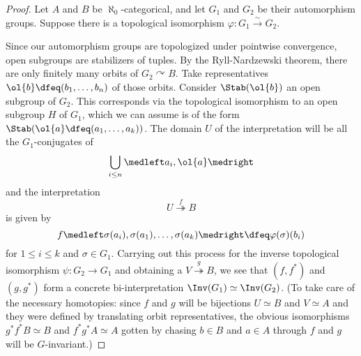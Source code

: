 
\begin{proof}
Let $A$ and $B$ be $\aleph_0$-categorical, and let $G_1$ and $G_2$ be their automorphism groups. Suppose there is a topological isomorphism $\varphi : G_1 \overset{\sim}{\to} G_2$.

Since our automorphism groups are topologized under pointwise convergence, open subgroups are stabilizers of tuples. By the Ryll-Nardzewski theorem, there are only finitely many orbits of $G_2 \curvearrowright B.$ Take representatives $\ol{b} \dfeq (b_1, \dots, b_n)$ of those orbits. Consider $\Stab(\ol{b})$ an open subgroup of $G_2$. This corresponds via the topological isomorphism to an open subgroup $H$ of $G_1$, which we can assume is of the form $\Stab(\ol{a} \dfeq (a_1, \dots, a_k))$. The domain $U$ of the interpretation will be all the $G_1$-conjugates of $$\bigcup_{i \leq n} \medleft a_i, \ol{a}  \medright$$ and the interpretation $$U \overset{f}{\twoheadrightarrow} B$$ is given by $$f\medleft \sigma(a_i), \sigma(a_1), \dots, \sigma(a_k) \medright \dfeq \varphi(\sigma)(b_i)$$ for $1 \leq i \leq k$ and $\sigma \in G_1$. Carrying out this process for the inverse topological isomorphism $\psi : G_2 \to G_1$ and obtaining a $V \overset{g}{\twoheadrightarrow} B$, we see that $(f,f^*)$ and $(g,g^*)$ form a concrete bi-interpretation $\Inv(G_1) \simeq \Inv(G_2)$. (To take care of the necessary homotopies: since $f$ and $g$ will be bijections $U \simeq B$ and $V \simeq A$ and they were defined by translating orbit representatives, the obvious isomorphisms $g^* f^* B \simeq B$ and $f^* g^* A \simeq A$ gotten by chasing $b \in B$ and $a \in A$ through $f$ and $g$ will be $G$-invariant.)
\end{proof}

